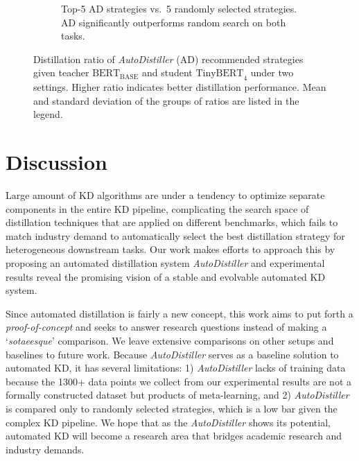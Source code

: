 \documentclass[11pt]{article}
\begin{document}
\begin{figure}[!tb]
\begin{subfigure}[b]{0.40\textwidth}
    \caption{Top-5 AD strategies vs.\ 5 randomly selected strategies. AD significantly outperforms random search on both tasks.}
    \label{fig:AD:compare-random}
    \end{subfigure}
    \caption{Distillation ratio of  \emph{AutoDistiller} (AD) recommended strategies given teacher $\text{BERT}_\text{BASE}$ and student $\text{TinyBERT}_4$ under two settings. Higher ratio indicates better distillation performance. Mean and standard deviation of the groups of ratios are listed in the legend.}
    \label{fig:AD}
    \vspace{-1em}
\end{figure}


\section{Discussion}
\label{discussion}

Large amount of KD algorithms are under a tendency to optimize separate components in the entire KD pipeline, complicating the search space of distillation techniques that are applied on different benchmarks, which fails to match industry demand to automatically select the best distillation strategy for heterogeneous downstream tasks. 
Our work makes efforts to approach this by proposing an automated distillation system \emph{AutoDistiller} and experimental results reveal the promising vision of a stable and evolvable automated KD system.

Since automated distillation is fairly a new concept, this work aims to put forth a \emph{proof-of-concept} and seeks to answer research questions instead of making a `\emph{sotaeesque}' comparison. We leave extensive comparisons on other setups and baselines to future work. Because \emph{AutoDistiller} serves as a baseline solution to automated KD, it has several limitations: 1) \emph{AutoDistiller} lacks of training data because the 1300+ data points we collect from our experimental results are not a formally constructed dataset but products of meta-learning,  and 2) \emph{AutoDistiller} is compared only to randomly selected strategies, which is a low bar given the complex KD pipeline. We hope that as the \emph{AutoDistiller} shows its potential, automated KD will become a research area that bridges academic research and industry demands. 
\end{document}
